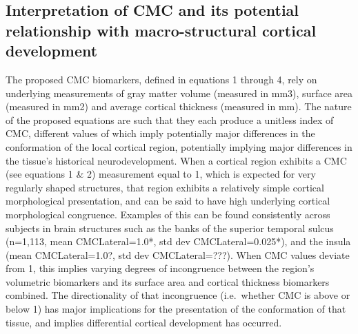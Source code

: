 \documentclass{article}
\begin{document}
\subsection{Interpretation of CMC and its potential relationship with macro-structural cortical development}

The proposed CMC biomarkers, defined in equations 1 through 4, rely on
underlying measurements of gray matter volume (measured in mm3), surface area
(measured in mm2) and average cortical thickness (measured in mm). The nature
of the proposed equations are such that they each produce a unitless index of
CMC, different values of which imply potentially major differences in the
conformation of the local cortical region, potentially implying major
differences in the tissue's historical neurodevelopment. When a cortical
region exhibits a CMC (see equations 1 \& 2) measurement equal to 1, which is
expected for very regularly shaped structures, that region exhibits a
relatively simple cortical morphological presentation, and can be said to
have high underlying cortical morphological congruence. Examples of this can
be found consistently across subjects in brain structures such as the banks
of the superior temporal sulcus (n=1,113, mean CMCLateral=1.0*, std dev
CMCLateral=0.025*), and the insula (mean CMCLateral=1.0?, std dev
CMCLateral=???). When CMC values deviate from 1, this implies varying degrees
of incongruence between the region's volumetric biomarkers and its surface
area and cortical thickness biomarkers combined. The directionality of that
incongruence (i.e.\ whether CMC is above or below 1) has major implications
for the presentation of the conformation of that tissue, and implies
differential cortical development has occurred.
\end{document}
